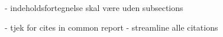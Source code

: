- indeholdsfortegnelse skal være uden subsections

- tjek for cites in common report - streamline alle citations